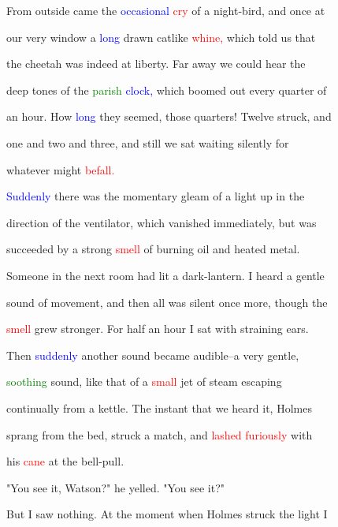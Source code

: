  From outside came the \textcolor{blue}{occasional} \textcolor{red}{cry} of a night-bird, and once at

 our very window a \textcolor{blue}{long} drawn catlike \textcolor{red}{whine,} which told us that

 the cheetah was indeed at \textcolor{BurntOrange}{liberty.} Far away we could hear the

 deep tones of the \textcolor{green}{parish} \textcolor{blue}{clock,} which boomed out every quarter of

 an hour. How \textcolor{blue}{long} they seemed, those quarters! Twelve struck, and

 one and two and three, and still we sat \textcolor{BurntOrange}{waiting} silently for

 whatever might \textcolor{red}{befall.}



 \textcolor{blue}{Suddenly} there was the momentary gleam of a light up in the

 direction of the ventilator, which \textcolor{BurntOrange}{vanished} \textcolor{BurntOrange}{immediately,} but was

 \textcolor{BurntOrange}{succeeded} by a strong \textcolor{red}{smell} of burning oil and heated metal.

 Someone in the next room had lit a dark-lantern. I heard a gentle

 sound of movement, and then all was silent once more, though the

 \textcolor{red}{smell} \textcolor{BurntOrange}{grew} stronger. For half an hour I sat with straining ears.

 Then \textcolor{blue}{suddenly} another sound became audible--a very gentle,

 \textcolor{green}{soothing} sound, like that of a \textcolor{red}{small} jet of steam \textcolor{BurntOrange}{escaping}

 continually from a kettle. The instant that we heard it, Holmes

 sprang from the bed, struck a match, and \textcolor{red}{lashed} \textcolor{red}{furiously} with

 his \textcolor{red}{cane} at the bell-pull.



 "You see it, Watson?" he \textcolor{BurntOrange}{yelled.} "You see it?"



 But I saw nothing. At the moment when Holmes struck the light I

